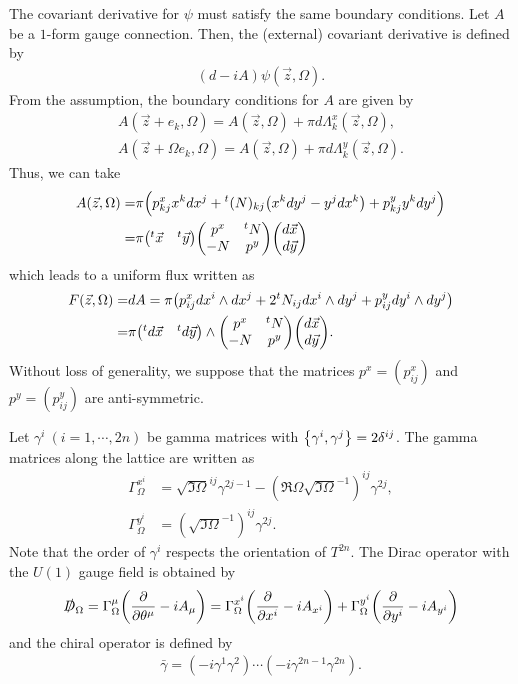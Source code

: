 \documentclass[11pt]{article}
\begin{document}
The covariant derivative for $\psi$ must satisfy the same boundary conditions. Let $A$ be a $1$-form gauge connection. Then, the (external) covariant derivative is defined by
\begin{align}
    (d-iA)\psi(\vec{z},\Omega ).
\end{align}
From the assumption, the boundary conditions for $A$ are given by
\begin{align}
    A(\vec{z}+e_k,\Omega)= A(\vec{z},\Omega )+\pi d\Lambda_k^x (\vec{z},\Omega ) ,\\
    A(\vec{z} + \Omega e_k,\Omega )= A(\vec{z},\Omega )+\pi d\Lambda_k^y (\vec{z},\Omega ).
\end{align}
Thus, we can take
\begin{align}
    A(\vec{z},\Omega )=& \pi \qty(  p^x_{kj} x^k dx^j +  {}^t(N)_{kj} \qty( x^k dy^j - y^j dx^k )+  p^y_{kj} y^k dy^j  )\nonumber \\
    =&\pi \mqty({}^t \vec{x} & {}^t \vec{y} )  \mqty( p^x & {}^tN \\-N & p^y ) \mqty(d\vec{x} \\  d\vec{y} )
\end{align}
which leads to a uniform flux written as
\begin{align}
    F(\vec{z},\Omega )=&dA= \pi\qty( p^x_{ij} dx^{i} \wedge dx^j + 2 {}^tN_{ij} dx^{i} \wedge dy^j + p^y_{ij} dy^{i} \wedge dy^j) \nonumber \\
    =& \pi \mqty({}^t d\vec{x} & {}^t d\vec{y} ) \wedge \mqty( p^x & {}^tN \\-N & p^y ) \mqty(d\vec{x} \\  d\vec{y} ).
\end{align}
Without loss of generality, we suppose that the matrices $p^x=(p^x_{ij})$ and $p^y=(p^y_{ij})$ are anti-symmetric.

Let $\gamma^i~(i=1,\cdots,2n)$ be gamma matrices with $\qty{\gamma^i, \gamma^j}=2 \delta^{ij}$. The gamma matrices along the lattice are written as
\begin{align}
    \Gamma^{x^i}_\Omega&=  \sqrt{\Im \Omega}^{ij} \gamma^{2j-1} -   (\Re \Omega \sqrt{\Im \Omega}^{-1})^{ij} \gamma^{2j},\\
    \Gamma^{y^i}_\Omega&=   (\sqrt{\Im \Omega}^{-1})^{ij} \gamma^{2j}.   
\end{align}
Note that the order of $\gamma^i$ respects the orientation of $T^{2n}$. The Dirac operator with the $U(1)$ gauge field is obtained by
\begin{align}
    \slashed{D}_\Omega= \Gamma^\mu_\Omega \qty( \pdv{}{\theta^\mu} - i A_\mu)=\Gamma^{x^i}_\Omega \qty( \pdv{}{x^i} - i A_{x^i})+\Gamma^{y^i}_\Omega \qty( \pdv{}{y^i} - i A_{y^i})
\end{align}
and the chiral operator is defined by
\begin{align}
    \bar{\gamma}= (-i \gamma^1 \gamma^2)\cdots (-i \gamma^{2n-1} \gamma^{2n}).
\end{align}
\end{document}
